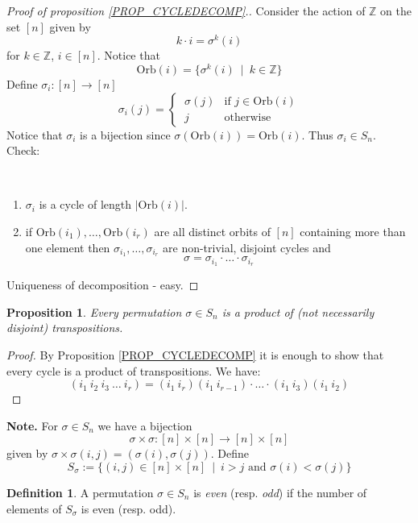 \documentclass[12pt, letterpaper, oneside]{article}
\theoremstyle{plain}
\newtheorem{proposition}[theorem]{Proposition}
\theoremstyle{definition}
\newtheorem{definition}[theorem]{Definition}
\newcommand{\Z}{{\mathbb Z}}
\newcommand{\Orb}{\mathrm{Orb}}
\newcommand{\benu}{\begin{enumerate}}
\newcommand{\eenu}{\end{enumerate}}
\newcommand{\vs}{\vskip 5mm}
\begin{document}
\vs\vs

\begin{proof}[Proof of proposition \ref{PROP_CYCLEDECOMP}.]
Consider the action of $\Z$ on the set $[n]$ given by 
$$k\cdot i = \sigma^{k}(i)$$
for $k\in \Z$, $i\in [n]$. Notice that 
$$\Orb(i) = \{ \sigma^{k}(i) \ \mid \  k\in \Z \}$$
Define $\sigma_{i}\colon [n] \to [n]$
$$
\sigma_{i}(j)  = 
\begin{cases}
 \ \sigma(j) & \text{if } j\in \Orb(i)  \\
\ j & \text{otherwise} 
\end{cases}
$$
Notice that $\sigma_{i}$ is a bijection since $\sigma(\Orb(i)) = \Orb(i)$. Thus $\sigma_{i}\in S_{n}$. 
Check: 

\vskip -13mm

\ 
\benu
\item $\sigma_{i}$ is a cycle of length $|\Orb(i)|$.
\item if $\Orb(i_{1}), \dots, \Orb(i_{r})$ are all distinct orbits of $[n]$ containing more 
than one element then $\sigma_{i_{1}}, \dots, \sigma_{i_{r}}$ are non-trivial, disjoint cycles and 
$$\sigma = \sigma_{i_{1}}\cdot {\dots}\cdot \sigma_{i_{r}}$$
\eenu
Uniqueness of decomposition - easy. 
\end{proof}

\vs\vs


\begin{proposition}
\label{PROP_TRANSPPROD}
Every permutation $\sigma\in S_{n}$ is a product of (not necessarily disjoint)  transpositions.
\end{proposition}


\vs

\begin{proof}
By Proposition \ref{PROP_CYCLEDECOMP} it is enough to show that every cycle is 
a product of transpositions. We have:
$$(i_{1} \ i_{2} \ i_{3} \ \dots \ i_{r}) = (i_{1} \ i_{r})(i_{1}\ i_{r-1})\cdot {\dots}\cdot (i_{1}\ i_{3})(i_{1}\ i_{2})$$ 
\end{proof}


\vs


\textbf{Note.} For $\sigma\in S_{n}$ we have a bijection
$$\sigma\times\sigma\colon [n]\times [n]\to [n]\times[n]$$
given by $\sigma\times\sigma(i, j) = (\sigma(i), \sigma(j))$.
Define
$$S_{\sigma} := \{ (i, j) \in [n]\times [n] \ \mid \ i> j \text{ and } \sigma(i) < \sigma(j) \}$$


\vs\vs

\begin{definition}
A permutation $\sigma\in S_{n}$ is \emph{even} (resp. \emph{odd}) if the number of elements 
of $S_{\sigma}$ is even (resp. odd).
\end{definition}
\end{document}
